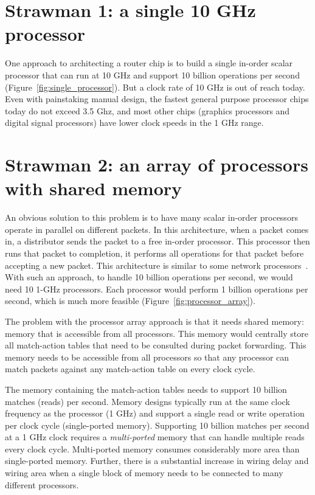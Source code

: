 \section{Strawman 1: a single 10 GHz processor}
One approach to architecting a router chip is to build a single in-order scalar
processor that can run at 10 GHz and support 10 billion operations per second
(Figure~\ref{fig:single_processor}). But a clock rate of 10 GHz is out of reach
today. Even with painstaking manual design, the fastest general purpose
processor chips today do not exceed 3.5 Ghz, and most other chips (\eg graphics
processors and digital signal processors) have lower clock speeds in the 1 GHz
range.

\section{Strawman 2: an array of processors with shared memory}
\label{ss:strawman2}

An obvious solution to this problem is to have many scalar in-order processors
operate in parallel on different packets. In this architecture, when a packet
comes in, a distributor sends the packet to a free in-order processor. This
processor then runs that packet to completion, \ie it performs all operations
for that packet before accepting a new packet. This architecture is similar to
some network processors~\cite{ixp1200, ixp2800, quantumflow}.  With such an
approach, to handle 10 billion operations per second, we would need 10 1-GHz
processors. Each processor would perform 1 billion operations per second, which
is much more feasible (Figure~\ref{fig:processor_array}).

The problem with the processor array approach is that it needs shared memory:
 memory that is accessible from all processors. This memory would centrally
store all match-action tables that need to be consulted during packet
forwarding. This memory needs to be accessible from all processors so that any
processor can match packets against any match-action table on every clock
cycle.

The memory containing the match-action tables needs to support 10 billion
matches (reads) per second. Memory designs typically run at the same clock
frequency as the processor (1 GHz) and support a single read or write operation
per clock cycle (single-ported memory). Supporting 10 billion matches per second at a
1 GHz clock requires a {\em multi-ported} memory that can handle multiple reads
every clock cycle. Multi-ported memory consumes considerably more area than
single-ported memory.  Further, there is a substantial increase in wiring delay
and wiring area when a single block of memory needs to be connected to many
different processors.

